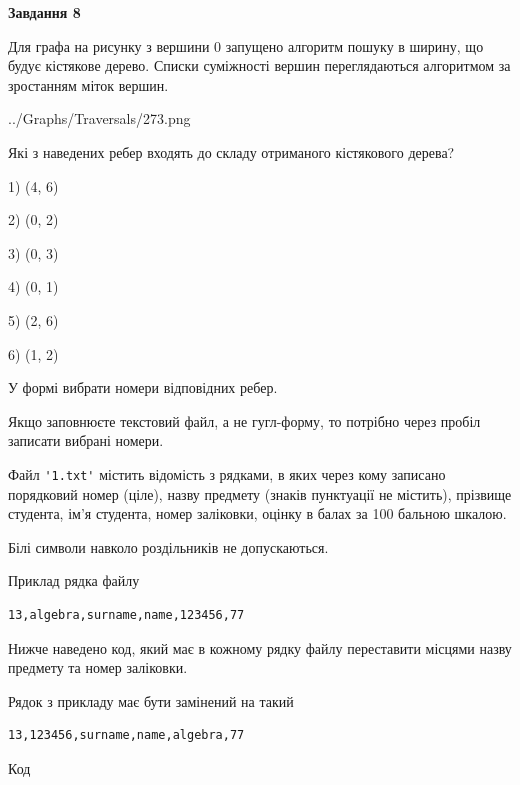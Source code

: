 \documentclass[12pt, ukrainian]{article}
\def\code#1{\Verb!#1!}
\begin{document}
{\begin {large}
{\begin {center}\textbf{Завдання 8}\end {center}}\par
Для графа на рисунку з вершини 0 запущено алгоритм пошуку в ширину, що будує кістякове дерево. Списки суміжності вершин переглядаються алгоритмом за зростанням міток вершин.\par
\begin{center}
	{../Graphs/Traversals/273.png}
\end{center}
\par Які з наведених ребер входять до складу отриманого кістякового дерева?\par
1) (4, 6)\par
2) (0, 2)\par
3) (0, 3)\par
4) (0, 1)\par
5) (2, 6)\par
6) (1, 2)\par
{\vskip 15pt} У формі вибрати номери відповідних ребер.


Якщо заповнюєте текстовий файл, а не гугл-форму, то потрібно через пробіл записа\-ти вибрані номери.\par
\newpage


Файл \code{'1.txt'} містить відомість з рядками, в яких через кому записано поряд\-ковий номер (ціле), назву предмету (знаків пунктуації не містить), прізвище студента, ім'я студента, номер заліковки, оцінку в балах за 100 бальною шкалою.

Білі символи навколо роздільників не допускаються.

Приклад рядка файлу



\begin{verbatim}
13,algebra,surname,name,123456,77
\end{verbatim}


Нижче наведено код, який має в кожному рядку файлу переставити місцями назву предмету та номер заліковки.

Рядок з прикладу має бути замінений на такий



\begin{verbatim}
13,123456,surname,name,algebra,77
\end{verbatim}




Код




\end{large}}
\end{document}
